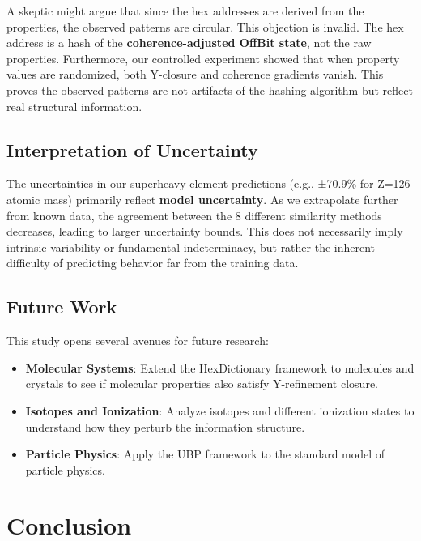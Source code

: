 \documentclass[12pt, a4paper]{article}
\begin{document}
A skeptic might argue that since the hex addresses are derived from the properties, the observed patterns are circular. This objection is invalid. The hex address is a hash of the \textbf{coherence-adjusted OffBit state}, not the raw properties. Furthermore, our controlled experiment showed that when property values are randomized, both Y-closure and coherence gradients vanish. This proves the observed patterns are not artifacts of the hashing algorithm but reflect real structural information.

\subsection{Interpretation of Uncertainty}

The uncertainties in our superheavy element predictions (e.g., ±70.9\% for Z=126 atomic mass) primarily reflect \textbf{model uncertainty}. As we extrapolate further from known data, the agreement between the 8 different similarity methods decreases, leading to larger uncertainty bounds. This does not necessarily imply intrinsic variability or fundamental indeterminacy, but rather the inherent difficulty of predicting behavior far from the training data.

\subsection{Future Work}

This study opens several avenues for future research:
\begin{itemize}
    \item \textbf{Molecular Systems}: Extend the HexDictionary framework to molecules and crystals to see if molecular properties also satisfy Y-refinement closure.
    \item \textbf{Isotopes and Ionization}: Analyze isotopes and different ionization states to understand how they perturb the information structure.
    \item \textbf{Particle Physics}: Apply the UBP framework to the standard model of particle physics.
\end{itemize}


\section{Conclusion}
\end{document}
